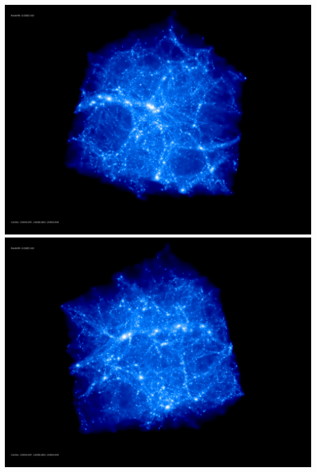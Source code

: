 \includegraphics[scale=0.1]{stages_07/rotate_00074.jpg} 
\includegraphics[scale=0.1]{stages_07/rotate_00131.jpg}

